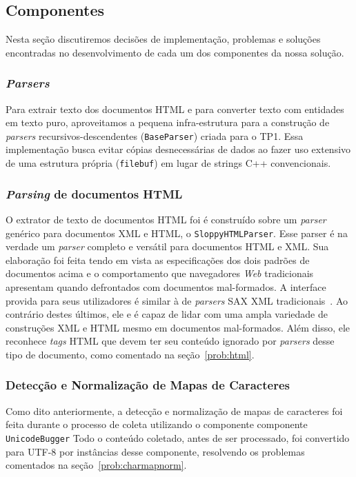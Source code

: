 \documentclass[10pt,twocolumn]{article}
\begin{document}
\subsection{Componentes}

Nesta seção discutiremos decisões de implementação, problemas e soluções
encontradas no desenvolvimento de cada um dos componentes da nossa
solução.

\subsubsection{\emph{Parsers}}

Para extrair texto dos documentos HTML e para converter texto com
entidades em texto puro, aproveitamos a pequena infra-estrutura para
a construção de \emph{parsers} recursivos-descendentes
(\texttt{BaseParser}) criada para o TP1. Essa implementação busca evitar cópias
desnecessárias de dados ao fazer uso extensivo de uma estrutura própria
(\texttt{filebuf}) em lugar de strings C++ convencionais.

\subsubsection{\emph{Parsing} de documentos HTML}

O extrator de texto de documentos HTML foi é construído sobre um
\emph{parser} genérico para documentos XML e HTML, o
\texttt{SloppyHTMLParser}. Esse parser é na verdade um
\emph{parser} completo e versátil para documentos HTML e XML. Sua
elaboração foi feita tendo em vista as especificações dos dois padrões
de documentos acima e o comportamento que navegadores \emph{Web}
tradicionais apresentam quando defrontados com documentos mal-formados.
A interface provida para seus utilizadores é similar à de \emph{parsers}
SAX XML tradicionais~\cite{saxxml, bray2006xml, html4tr}. Ao contrário
destes últimos, ele e é capaz de lidar com uma ampla variedade de
construções XML e HTML mesmo em documentos
mal-formados. Além disso, ele reconhece \emph{tags} HTML que devem ter
seu conteúdo ignorado por \emph{parsers} desse tipo de documento, como
comentado na seção~\ref{prob:html}.

\subsubsection{Detecção e Normalização de Mapas de Caracteres}

Como dito anteriormente, a detecção e normalização de mapas de
caracteres foi feita durante o processo de coleta utilizando o
componente componente \texttt{UnicodeBugger} Todo
o conteúdo coletado, antes de ser processado, foi convertido para UTF-8
por instâncias desse componente, resolvendo os problemas comentados na
seção~\ref{prob:charmapnorm}.
\end{document}
